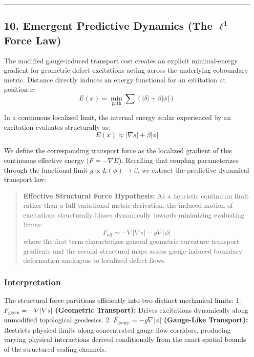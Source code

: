\documentclass[
]{article}
\begin{document}
\begin{center}\rule{0.5\linewidth}{0.5pt}\end{center}

\subsection{\texorpdfstring{10. Emergent Predictive Dynamics (The
\(\ell^1\) Force
Law)}{10. Emergent Predictive Dynamics (The \textbackslash ell\^{}1 Force Law)}}\label{emergent-predictive-dynamics-the-ell1-force-law}

The modified gauge-induced transport cost creates an explicit
minimal-energy gradient for geometric defect excitations acting across
the underlying coboundary metric. Distance directly induces an energy
functional for an excitation at position \(x\):
\[ E(x) = \min_{\text{path}} \sum \left(|\delta| + \beta |\phi|\right) \]

In a continuous localized limit, the internal energy scalar experienced
by an excitation evaluates structurally as:
\[ E(x) \approx |\nabla s| + \beta |\phi| \]

We define the corresponding transport force as the localized gradient of
this continuous effective energy (\(F = -\nabla E\)). Recalling that
coupling parameterizes through the functional limit
\(g \propto L(\phi) \rightarrow \beta\), we extract the predictive
dynamical transport law:

\begin{quote}
\textbf{Effective Structural Force Hypothesis:} As a heuristic continuum
limit rather than a full variational metric derivation, the induced
motion of excitations structurally biases dynamically towards minimizing
evaluating limits:
\[ F_{\text{eff}} \sim -\nabla |\nabla s| - g \nabla |\phi| \] where the
first term characterizes general geometric curvature transport gradients
and the second structural maps assess gauge-induced boundary deformation
analogous to localized defect flows.
\end{quote}

\subsubsection{Interpretation}\label{interpretation-3}

The structural force partitions efficiently into two distinct mechanical
limits: 1. \textbf{\(F_{\text{geom}} = -\nabla|\nabla s|\) (Geometric
Transport):} Drives excitations dynamically along unmodified topological
geodesics. 2. \textbf{\(F_{\text{gauge}} = -g\nabla|\phi|\) (Gauge-Like
Transport):} Restricts physical limits along concentrated gauge flow
corridors, producing varying physical interactions derived conditionally
from the exact spatial bounds of the structured scaling channels.
\end{document}
